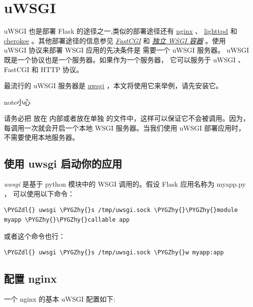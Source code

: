 \documentclass[a4paper,12pt]{sphinxmanual}
\def\PYGZdl{\char`\$}
\def\PYGZhy{\char`\-}
\begin{document}
\section{uWSGI}
\label{deploying/uwsgi:deploying-uwsgi}\label{deploying/uwsgi::doc}\label{deploying/uwsgi:uwsgi}
uWSGI 也是部署 Flask 的途径之一,类似的部署途径还有 \href{http://nginx.org/}{nginx} 、 \href{http://www.lighttpd.net/}{lighttpd} 和
\href{http://www.cherokee-project.com/}{cherokee} 。其他部署途径的信息参见 {\hyperref[deploying/fastcgi:deploying-fastcgi]{\emph{FastCGI}}} 和
{\hyperref[deploying/wsgi-standalone:deploying-wsgi-standalone]{\emph{独立 WSGI 容器}}} 。使用 uWSGI 协议来部署 WSGI 应用的先决条件是
需要一个 uWSGI 服务器。 uWSGI 既是一个协议也是一个服务器。如果作为一个服务器，
它可以服务于 uWSGI 、 FastCGI 和 HTTP 协议。

最流行的 uWSGI 服务器是 \href{http://projects.unbit.it/uwsgi/}{uwsgi} ，本文将使用它来举例，请先安装它。

\begin{notice}{note}{小心}

请务必把  放在  内部或者放在单独
的文件中，这样可以保证它不会被调用。因为，每调用一次就会开启一个本地 WSGI
服务器。当我们使用 uWSGI 部署应用时，不需要使用本地服务器。
\end{notice}


\subsection{使用 uwsgi 启动你的应用}
\label{deploying/uwsgi:id1}
\emph{uwsgi} 是基于 python 模块中的 WSGI 调用的。假设 Flask 应用名称为 myapp.py ，
可以使用以下命令：

\begin{Verbatim}[commandchars=\\\{\}]
\PYGZdl{} uwsgi \PYGZhy{}s /tmp/uwsgi.sock \PYGZhy{}\PYGZhy{}module myapp \PYGZhy{}\PYGZhy{}callable app
\end{Verbatim}

或者这个命令也行：

\begin{Verbatim}[commandchars=\\\{\}]
\PYGZdl{} uwsgi \PYGZhy{}s /tmp/uwsgi.sock \PYGZhy{}w myapp:app
\end{Verbatim}


\subsection{配置 nginx}
\label{deploying/uwsgi:nginx}
一个 nginx 的基本 uWSGI 配置如下:
\end{document}
